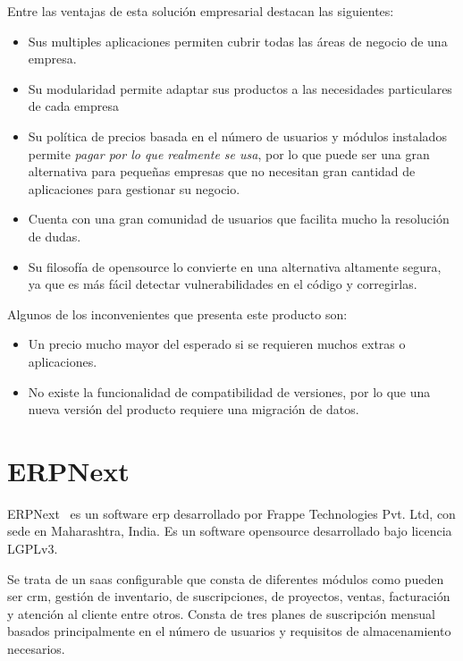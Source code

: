 Entre las ventajas de esta solución empresarial destacan las siguientes:

\begin{itemize}
\item Sus multiples aplicaciones permiten cubrir todas las áreas de negocio de una empresa.
\item Su modularidad permite adaptar sus productos a las necesidades particulares de cada empresa
\item Su política de precios basada en el número de usuarios y módulos instalados permite \textit{pagar por lo que realmente se usa}, por lo que puede ser una gran alternativa para pequeñas empresas que no necesitan gran cantidad de aplicaciones para gestionar su negocio.
\item Cuenta con una gran comunidad de usuarios que facilita mucho la resolución de dudas. 
\item Su filosofía de \gls{opensource} lo convierte en una alternativa altamente segura, ya que es más fácil detectar vulnerabilidades en el código y corregirlas.
\end{itemize}

Algunos de los inconvenientes que presenta este producto son:

\begin{itemize}
\item Un precio mucho mayor del esperado si se requieren muchos extras o aplicaciones.
\item No existe la funcionalidad de compatibilidad de versiones, por lo que una nueva versión del producto requiere una migración de datos.
\end{itemize}



\section{ERPNext}
\label{sec:estado-arte-erpNext}
ERPNext~\cite{ERPNext} es un software \acrshort{erp} desarrollado por Frappe Technologies Pvt. Ltd, con sede en Maharashtra, India. Es un software \gls{opensource} desarrollado bajo licencia LGPLv3.

Se trata de un \acrshort{saas} configurable que consta de diferentes módulos como pueden ser \acrshort{crm}, gestión de inventario, de suscripciones, de proyectos, ventas, facturación y atención al cliente entre otros. Consta de tres planes de suscripción mensual basados principalmente en el número de usuarios y requisitos de almacenamiento necesarios.

